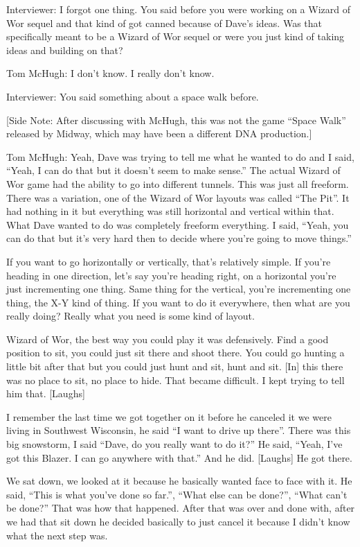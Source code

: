 \textcolor{interviewer}{Interviewer:} I forgot one thing. You said before you were working on a Wizard of Wor sequel and that kind of got canned because of Dave’s ideas. Was that specifically meant to be a Wizard of Wor sequel or were you just kind of taking ideas and building on that?

\textcolor{interviewee}{Tom McHugh:} I don’t know. I really don’t know.

\textcolor{interviewer}{Interviewer:} You said something about a space walk before.

[Side Note: After discussing with McHugh, this was not the game “Space Walk” released by Midway, which may have been a different DNA production.]

\textcolor{interviewee}{Tom McHugh:} Yeah, Dave was trying to tell me what he wanted to do and I said, “Yeah, I can do that but it doesn’t seem to make sense.” The actual Wizard of Wor game had the ability to go into different tunnels. This was just all freeform. There was a variation, one of the Wizard of Wor layouts was called “The Pit”. It had nothing in it but everything was still horizontal and vertical within that. What Dave wanted to do was completely freeform everything. I said, “Yeah, you can do that but it’s very hard then to decide where you’re going to move things.”

If you want to go horizontally or vertically, that’s relatively simple. If you’re heading in one direction, let’s say you’re heading right, on a horizontal you’re just incrementing one thing. Same thing for the vertical, you’re incrementing one thing, the X-Y kind of thing. If you want to do it everywhere, then what are you really doing? Really what you need is some kind of layout.

Wizard of Wor, the best way you could play it was defensively. Find a good position to sit, you could just sit there and shoot there. You could go hunting a little bit after that but you could just hunt and sit, hunt and sit. [In] this there was no place to sit, no place to hide. That became difficult. I kept trying to tell him that. [Laughs]

I remember the last time we got together on it before he canceled it we were living in Southwest Wisconsin, he said “I want to drive up there”. There was this big snowstorm, I said “Dave, do you really want to do it?” He said, “Yeah, I’ve got this Blazer. I can go anywhere with that.” And he did. [Laughs] He got there.

We sat down, we looked at it because he basically wanted face to face with it. He said, “This is what you’ve done so far.”, “What else can be done?”, “What can’t be done?” That was how that happened. After that was over and done with, after we had that sit down he decided basically to just cancel it because I didn’t know what the next step was.

